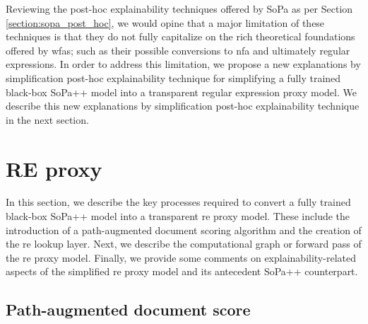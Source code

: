 Reviewing the post-hoc explainability techniques offered by SoPa as per Section
\ref{section:sopa_post_hoc}, we would opine that a major limitation of these
techniques is that they do not fully capitalize on the rich theoretical
foundations offered by \ac{wfas}; such as their possible conversions to \ac{nfa}
and ultimately regular expressions. In order to address this limitation, we
propose a new explanations by simplification post-hoc explainability technique
for simplifying a fully trained black-box SoPa++ model into a transparent
regular expression proxy model. We describe this new explanations by
simplification post-hoc explainability technique in the next section.

\section{RE proxy}

In this section, we describe the key processes required to convert a
fully trained black-box SoPa++ model into a transparent \ac{re} proxy model. These include
the introduction of a path-augmented document scoring algorithm and the creation
of the \ac{re} lookup layer. Next, we describe the computational graph or forward
pass of the \ac{re} proxy model. Finally, we provide some comments on
explainability-related aspects of the simplified \ac{re} proxy model and its
antecedent SoPa++ counterpart.

\subsection{Path-augmented document score}

